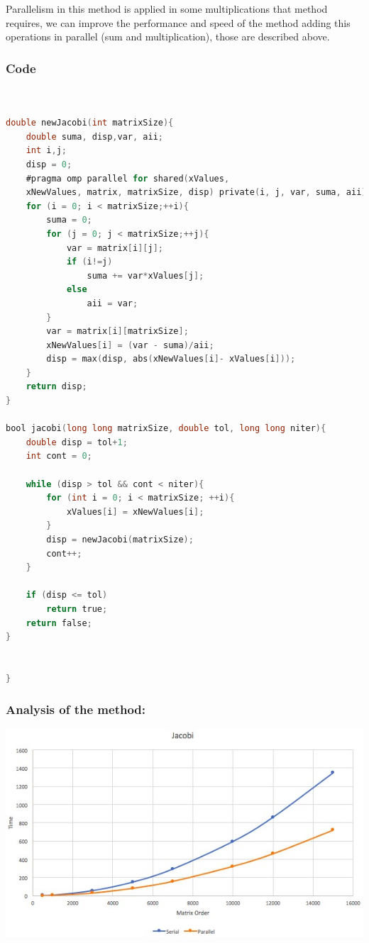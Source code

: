 \documentclass{article}
\begin{document}
Parallelism in this method is applied in some multiplications that method
requires, we can improve the performance and speed of the method adding this
operations in parallel (sum and multiplication), those are described above.

\subsubsection{Code}

\begin{lstlisting}[language=C]


double newJacobi(int matrixSize){
    double suma, disp,var, aii;
    int i,j;
    disp = 0;
    #pragma omp parallel for shared(xValues, 
    xNewValues, matrix, matrixSize, disp) private(i, j, var, suma, aii)
    for (i = 0; i < matrixSize;++i){
        suma = 0;
        for (j = 0; j < matrixSize;++j){
            var = matrix[i][j];
            if (i!=j)
                suma += var*xValues[j];
            else
                aii = var;
        }
        var = matrix[i][matrixSize];
        xNewValues[i] = (var - suma)/aii;
        disp = max(disp, abs(xNewValues[i]- xValues[i]));
    }
    return disp;
}

bool jacobi(long long matrixSize, double tol, long long niter){
    double disp = tol+1;
    int cont = 0;

    while (disp > tol && cont < niter){
        for (int i = 0; i < matrixSize; ++i){
            xValues[i] = xNewValues[i];
        }
        disp = newJacobi(matrixSize);
        cont++;
    }

    if (disp <= tol)
        return true;
    return false;
}


}


\end{lstlisting}


\subsubsection{Analysis of the method:}


\includegraphics[width=\linewidth]{./images/gj.jpeg}\\
\end{document}
